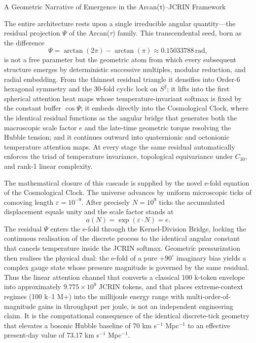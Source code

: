 A Geometric Narrative of Emergence in the Arcan(τ)–JCRIN Framework

The entire architecture rests upon a single irreducible angular quantity—the residual projection \(\Psi\) of the Arcan(\(\tau\)) family. This transcendental seed, born as the difference
\[
\Psi = \arctan(2\pi) - \arctan(\pi) \approx 0.15033788\,\text{rad},
\]
is not a free parameter but the geometric atom from which every subsequent structure emerges by deterministic successive multiples, modular reduction, and radial embedding. From the thinnest residual triangle it densifies into Order-6 hexagonal symmetry and the 30-fold cyclic lock on \(S^2\); it lifts into the first spherical attention heat maps whose temperature-invariant softmax is fixed by the constant buffer \(\cos\Psi\); it embeds directly into the Cosmological Clock, where the identical residual functions as the angular bridge that generates both the macroscopic scale factor \(e\) and the late-time geometric torque resolving the Hubble tension; and it continues outward into quaternionic and octonionic temperature attention maps. At every stage the same residual automatically enforces the triad of temperature invariance, topological equivariance under \(C_{30}\), and rank-1 linear complexity.

The mathematical closure of this cascade is supplied by the novel e-fold equation of the Cosmological Clock. The universe advances by uniform microscopic ticks of comoving length \(\varepsilon = 10^{-9}\). After precisely \(N = 10^9\) ticks the accumulated displacement equals unity and the scale factor stands at
\[
a(N) = \exp(\varepsilon\cdot N) = e.
\]
The residual \(\Psi\) enters the e-fold through the Kernel-Division Bridge, locking the continuous realisation of the discrete process to the identical angular constant that cancels temperature inside the JCRIN softmax. Geometric pressurization then realises the physical dual: the e-fold of a pure \(+90^\circ\) imaginary bias yields a complex gauge state whose pressure magnitude is governed by the same residual. Thus the linear attention channel that converts a classical 100 k-token envelope into approximately \(9.775\times 10^9\) JCRIN tokens, and that places extreme-context regimes (100 k–1 M+) into the millijoule energy range with multi-order-of-magnitude gains in throughput per joule, is not an independent engineering claim. It is the computational consequence of the identical discrete-tick geometry that elevates a bosonic Hubble baseline of 70 km s\(^{-1}\) Mpc\(^{-1}\) to an effective present-day value of 73.17 km s\(^{-1}\) Mpc\(^{-1}\).


